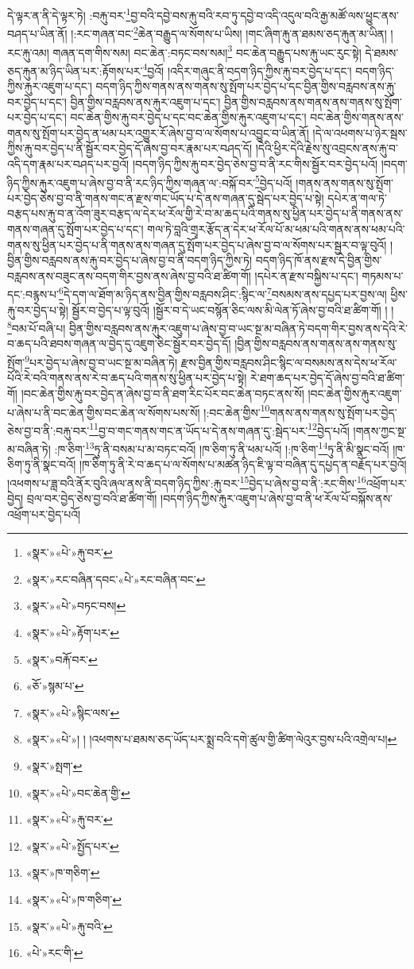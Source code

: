 དེ་ལྟར་ན་ནི་དེ་ལྟར་ཏེ། :བརྐུ་བར་\footnote{«སྣར་»«པེ་»རྐུ་བར་}བྱ་བའི་དབྱེ་བས་རྐུ་བའི་རབ་ཏུ་དབྱེ་བ་འདི་འདུལ་བའི་རྒྱ་མཚོ་ལས་ཕྱུང་ནས་བཤད་པ་ཡིན་ནོ། །:རང་གཞན་བང་\footnote{«སྣར་»རང་བཞིན་དབང་«པེ་»རང་བཞིན་བང་}ཆེན་བརྒྱུད་ལ་སོགས་པ་ཡིས། །གང་ཞིག་རྐུ་ན་ཐམས་ཅད་རྐུན་མ་ཡིན། །རང་རྐུ་འམ། གཞན་དག་གིས་སམ། བང་ཆེན་:བཏང་བས་སམ།\footnote{«སྣར་»«པེ་»བཏང་བས།} བང་ཆེན་བརྒྱུད་པས་རྐུ་ཡང་རུང་སྟེ། དེ་ཐམས་ཅད་རྐུན་མ་ཉིད་ཡིན་པར་:རྟོགས་པར་\footnote{«སྣར་»«པེ་»རྟོག་པར་}བྱའོ། །འདིར་གཞུང་ནི་བདག་ཉིད་ཀྱིས་རྐུ་བར་བྱེད་པ་དང་། བདག་ཉིད་ཀྱིས་རྐུར་འཇུག་པ་དང་། བདག་ཉིད་ཀྱིས་གནས་ནས་གནས་སུ་སྤོག་པར་བྱེད་པ་དང་བྱིན་གྱིས་བརླབས་ནས་རྐུ་བར་བྱེད་པ་དང་། བྱིན་གྱིས་བརླབས་ནས་རྐུར་འཇུག་པ་དང་། བྱིན་གྱིས་བརླབས་ནས་གནས་ནས་གནས་སུ་སྤོག་པར་བྱེད་པ་དང་། བང་ཆེན་གྱིས་རྐུ་བར་བྱེད་པ་དང་བང་ཆེན་གྱིས་རྐུར་འཇུག་པ་དང་། བང་ཆེན་གྱིས་གནས་ནས་གནས་སུ་སྤོག་པར་བྱེད་ན་ཕམ་པར་འགྱུར་རོ་ཞེས་བྱ་བ་ལ་སོགས་པ་འབྱུང་བ་ཡིན་ནོ། །དེ་ལ་འཕགས་པ་ཉེར་སྦས་ཀྱིས་རྐུ་བར་བྱེད་པ་ནི་སྦྱོར་བར་བྱེད་དོ་ཞེས་བྱ་བར་རྣམ་པར་བཤད་དོ། །དེའི་ཕྱིར་དེའི་རྗེས་སུ་འབྲངས་ནས་རྐུ་བ་འདི་དག་རྣམ་པར་བཤད་པར་བྱའོ། །བདག་ཉིད་ཀྱིས་རྐུ་བར་བྱེད་ཅེས་བྱ་བ་ནི་རང་གིས་སྦྱོར་བར་བྱེད་པའོ། །བདག་ཉིད་ཀྱིས་རྐུར་འཇུག་པ་ཞེས་བྱ་བ་ནི་རང་ཉིད་ཀྱིས་གཞན་ལ་:བསྐོ་བར་\footnote{«སྣར་»བརྐོ་བར་}བྱེད་པའོ། །གནས་ནས་གནས་སུ་སྤོག་པར་བྱེད་ཅེས་བྱ་བ་ནི་གནས་གང་ན་རྫས་གང་ཡོད་པ་དེ་ནས་གཞན་དུ་སྦེད་པར་བྱེད་པ་སྟེ། དཔེར་ན་གལ་ཏེ་བརྩད་པས་རྐུ་བ་ན་འོག་ཟུར་བརྩད་ལ་དེར་ཕ་རོལ་གྱི་རེ་བ་མ་ཆད་པའི་གནས་སུ་ཕྱིན་པར་བྱེད་པ་ནི་གནས་ནས་གནས་གཞན་དུ་སྤོག་པར་བྱེད་པ་དང་། གལ་ཏེ་བླའི་གྲྭར་རྩོད་ན་དེར་ཕ་རོལ་པོ་མ་ཕམ་པའི་གནས་ནས་ཕམ་པའི་གནས་སུ་ཕྱིན་པར་བྱེད་པ་ནི་གནས་ནས་གཞན་དུ་སྤོག་པར་བྱེད་པ་ཞེས་བྱ་བ་ལ་སོགས་པར་སྦྱར་བ་ལྟ་བུའོ། །བྱིན་གྱིས་བརླབས་ནས་རྐུ་བར་བྱེད་པ་ཞེས་བྱ་བ་ནི་བདག་ཉིད་ཀྱིས་ཏེ། བདག་ཉིད་ཁོ་ནས་རྫས་དེ་བྱིན་གྱིས་བརླབས་ནས་བཟུང་ནས་བདག་གིར་བྱས་ནས་ཞེས་བྱ་བའི་ཐ་ཚིག་གོ། །དཔེར་ན་རྫས་བསྐྱིས་པ་དང་། གཏམས་པ་དང་:བརྙས་པ་\footnote{«ཅོ་»སྙམ་པ་}དེ་དག་ལ་ཐོག་མ་ཉིད་ནས་བྱིན་གྱིས་བརླབས་ཤིང་:སྙིང་ལ་\footnote{«སྣར་»«པེ་»སྙིང་ལས་}བསམས་ནས་དཔྱད་པར་བྱས་ལ། ཕྱིས་རྐུ་བར་བྱེད་པ་སྟེ། སྦྱོར་བ་བྱེད་པ་ལྟ་བུའོ། །སྦྱོར་བ་དེ་ཡང་བསྙོན་ཅིང་ལས་མི་ལེན་ཏོ་ཞེས་བྱ་བའི་ཐ་ཚིག་གོ། ། །\footnote{«སྣར་»«པེ་»། ། །འཕགས་པ་ཐམས་ཅད་ཡོད་པར་སྨྲ་བའི་དགེ་ཚུལ་གྱི་ཚིག་ལེའུར་བྱས་པའི་འགྲེལ་པ། }བམ་པོ་བཞི་པ། བྱིན་གྱིས་བརླབས་ནས་རྐུར་འཇུག་པ་ཞེས་བྱ་བ་ཡང་སྔ་མ་བཞིན་ཏེ་བདག་གིར་བྱས་ནས་དེའི་རེ་བ་ཆད་པའི་ཐབས་གཞན་ལ་བྱེད་དུ་འཇུག་ཅིང་སྦྱོར་བར་བྱེད་དོ། །བྱིན་གྱིས་བརླབས་ནས་གནས་ནས་གནས་སུ་སྤོག་\footnote{«སྣར་»སྤག་}པར་བྱེད་པ་ཞེས་བྱ་བ་ཡང་སྔ་མ་བཞིན་ཏེ། རྫས་བྱིན་གྱིས་བརླབས་ཤིང་སྙིང་ལ་བསམས་ནས་དེས་ཕ་རོལ་པོའི་རེ་བའི་གནས་ནས་རེ་བ་ཆད་པའི་གནས་སུ་ཕྱིན་པར་བྱེད་པ་སྟེ། རེ་ཐག་ཆད་པར་བྱེད་དོ་ཞེས་བྱ་བའི་ཐ་ཚིག་གོ། །བང་ཆེན་གྱིས་རྐུ་བར་བྱེད་ན་ཞེས་བྱ་བ་ནི་ཐག་རིང་པོར་བང་ཆེན་བཏང་ནས་སོ། །བང་ཆེན་གྱིས་རྐུར་འཇུག་པ་ཞེས་པ་ནི་བང་ཆེན་གྱིས་བང་ཆེན་ལ་སོགས་པས་སོ། །:བང་ཆེན་གྱིས་\footnote{«སྣར་»«པེ་»བང་ཆེན་གྱི་}གནས་ནས་གནས་སུ་སྤོག་པར་བྱེད་ཅེས་བྱ་བ་ནི་:བརྐུ་བར་\footnote{«སྣར་»«པེ་»རྐུ་བར་}བྱ་བ་གང་གནས་གང་ན་ཡོད་པ་དེ་ནས་གཞན་དུ་:སྦེད་པར་\footnote{«སྣར་»«པེ་»སྤྱོད་པར་}བྱེད་པའོ། །གནས་ཀྱང་སྔ་མ་བཞིན་ཏེ། :ཁ་ཅིག་\footnote{«སྣར་»ཁ་གཅིག་}ཏུ་ནི་བསམ་པ་མ་བཏང་བའོ། །ཁ་ཅིག་ཏུ་ནི་ཕམ་པའོ། །:ཁ་ཅིག་\footnote{«སྣར་»«པེ་»ཁ་གཅིག་}ཏུ་ནི་མི་སྣང་བའོ། །ཁ་ཅིག་ཏུ་ནི་སྣང་བའོ། །ཁ་ཅིག་ཏུ་ནི་རེ་བ་ཆད་པ་ལ་སོགས་པ་མཚན་ཉིད་ཇི་ལྟ་བ་བཞིན་དུ་དཔྱད་ན་བརྗོད་པར་བྱའོ། །འཕགས་པ་ཟླ་བའི་ནོར་བུའི་ཞལ་ནས་ནི་བདག་ཉིད་ཀྱིས་:རྐུ་བར་\footnote{«སྣར་»«པེ་»རྐུ་བའི་}བྱེད་པ་ཞེས་བྱ་བ་ནི་:རང་གིས་\footnote{«པེ་»རང་གི་}འཕྲོག་པར་བྱེད། བྲལ་བར་བྱེད་ཅེས་བྱ་བའི་ཐ་ཚིག་གོ། །བདག་ཉིད་ཀྱིས་རྐུར་འཇུག་པ་ཞེས་བྱ་བ་ནི་ཕ་རོལ་པོ་བསྐོས་ནས་འཕྲོག་པར་བྱེད་པའོ། 